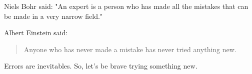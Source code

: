 \documentclass{article}
\begin{document}
Niels Bohr said: "An expert is a person who has made all the mistakes that can be made in a very narrow field."

Albert Einstein said:
\begin{quote}
Anyone who has never made a mistake has never tried anything new.
\end{quote}

Errors are inevitables. So, let's be brave trying something new.
\end{document}
